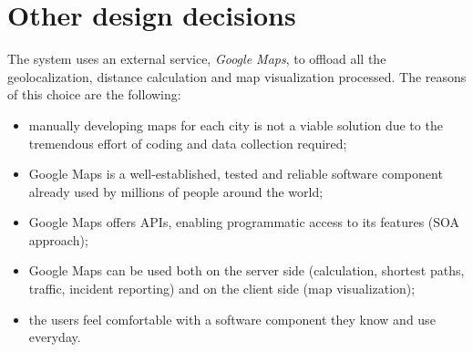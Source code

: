 \section{Other design decisions}
\label{sec:other-design-decisions}

The system uses an external service, \emph{Google Maps}, to offload all the geolocalization, distance calculation and map visualization processed. The reasons of this choice are the following:
\begin{itemize}
    \item manually developing maps for each city is not a viable solution due to the tremendous effort of coding and data collection required;
    \item Google Maps is a well-established, tested and reliable software component already used by millions of people around the world;
    \item Google Maps offers APIs, enabling programmatic access to its features (SOA approach);
    \item Google Maps can be used both on the server side (calculation, shortest paths, traffic, incident reporting) and on the client side (map visualization);
    \item the users feel comfortable with a software component they know and use everyday.
\end{itemize}
